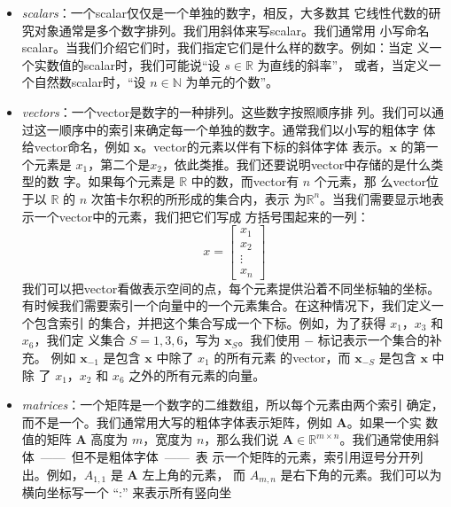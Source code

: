 \begin{itemize}
\item \emph{\gls{scalars}}：一个\gls*{scalar}仅仅是一个单独的数字，相反，大多数其
  它线性代数的研究对象通常是多个数字排列。我们用斜体来写\gls*{scalar}。我们通常用
  小写命名\gls*{scalar}。当我们介绍它们时，我们指定它们是什么样的数字。例如：当定
  义一个实数值的\gls*{scalar}时，我们可能说``设 $s \in \mathbb{R}$ 为直线的斜率''，
  或者，当定义一个自然数\gls*{scalar}时，``设 $n \in \mathbb{N}$ 为单元的个数''。
\item \emph{\gls{vectors}}：一个\gls*{vector}是数字的一种排列。这些数字按照顺序排
  列。我们可以通过这一顺序中的索引来确定每一个单独的数字。通常我们以小写的粗体字
  体给\gls*{vector}命名，例如 $\pmb{x}$。\gls*{vector}的元素以伴有下标的斜体字体
  表示。$\pmb{x}$ 的第一个元素是
  $x_1$，第二个是$x_2$，依此类推。我们还要说明\gls*{vector}中存储的是什么类型的数
  字。如果每个元素是 $\mathbb{R}$ 中的数，而\gls*{vector}有 $n$ 个元素，那
  么\gls*{vector}位于以 $\mathbb{R}$ 的 $n$ 次笛卡尔积的所形成的集合内，表示
  为$\mathbb{R}^n$。当我们需要显示地表示一个\gls*{vector}中的元素，我们把它们写成
  方括号围起来的一列：
  \begin{equation}
    x = \begin{bmatrix}x_1\\ x_2\\ \vdots\\ x_n\end{bmatrix}
    \label{eq:vector_example}
  \end{equation}
  我们可以把\gls*{vector}看做表示空间的点，每个元素提供沿着不同坐标轴的坐标。\\
  有时候我们需要索引一个向量中的一个元素集合。在这种情况下，我们定义一个包含索引
  的集合，并把这个集合写成一个下标。例如，为了获得 $x_1$，$x_3$ 和 $x_6$，我们定
  义集合 $S = {1, 3, 6}$，写为 $\pmb{x}_S$。我们使用 $-$ 标记表示一个集合的补充。
  例如 $\pmb{x}_{-1}$ 是包含 $\pmb{x}$ 中除了 $x_1$ 的所有元素
  的\gls*{vector}，而 $\pmb{x}_{-S}$ 是包含 $\pmb{x}$ 中除
  了 $x_1$，$x_2$ 和 $x_6$ 之外的所有元素的向量。
\item \emph{\gls{matrices}}：一个矩阵是一个数字的二维数组，所以每个元素由两个索引
  确定，而不是一个。我们通常用大写的粗体字体表示矩阵，例如 $\pmb{A}$。如果一个实
  数值的矩阵 $\pmb{A}$ 高度为 $m$，宽度为 $n$，那么我们说
  $\pmb{A} \in \mathbb{R}^{m \times n}$。我们通常使用斜体~——~但不是粗体字体~——~表
  示一个矩阵的元素，索引用逗号分开列出。例如，$A_{1,1}$ 是 $\pmb{A}$ 左上角的元素，
  而 $A_{m,n}$ 是右下角的元素。我们可以为横向坐标写一个 ``:'' 来表示所有竖向坐

\end{itemize}
